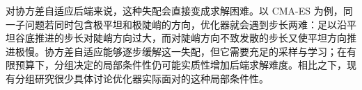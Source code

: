 对协方差自适应后端来说，这种失配会直接变成求解困难。以 CMA-ES 为例，同一子问题若同时包含极平坦和极陡峭的方向，优化器就会遇到步长两难：足以沿平坦谷底推进的步长对陡峭方向过大，而对陡峭方向不致发散的步长又使平坦方向推进极慢。协方差自适应能够逐步缓解这一失配，但它需要充足的采样与学习；在有限预算下，分组决定的局部条件性仍可能实质性增加后端求解难度。相比之下，现有分组研究很少具体讨论优化器实际面对的这种局部条件性。